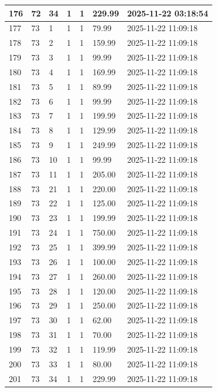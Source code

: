 \begin{longtable}{|l|l|l|l|l|l|l|}
176 & 72 & 34 & 1 & 1 & 229.99 & 2025-11-22 03:18:54 \\ \hline 
177 & 73 & 1 & 1 & 1 & 79.99 & 2025-11-22 11:09:18 \\ \hline 
178 & 73 & 2 & 1 & 1 & 159.99 & 2025-11-22 11:09:18 \\ \hline 
179 & 73 & 3 & 1 & 1 & 99.99 & 2025-11-22 11:09:18 \\ \hline 
180 & 73 & 4 & 1 & 1 & 169.99 & 2025-11-22 11:09:18 \\ \hline 
181 & 73 & 5 & 1 & 1 & 89.99 & 2025-11-22 11:09:18 \\ \hline 
182 & 73 & 6 & 1 & 1 & 99.99 & 2025-11-22 11:09:18 \\ \hline 
183 & 73 & 7 & 1 & 1 & 199.99 & 2025-11-22 11:09:18 \\ \hline 
184 & 73 & 8 & 1 & 1 & 129.99 & 2025-11-22 11:09:18 \\ \hline 
185 & 73 & 9 & 1 & 1 & 249.99 & 2025-11-22 11:09:18 \\ \hline 
186 & 73 & 10 & 1 & 1 & 99.99 & 2025-11-22 11:09:18 \\ \hline 
187 & 73 & 11 & 1 & 1 & 205.00 & 2025-11-22 11:09:18 \\ \hline 
188 & 73 & 21 & 1 & 1 & 220.00 & 2025-11-22 11:09:18 \\ \hline 
189 & 73 & 22 & 1 & 1 & 125.00 & 2025-11-22 11:09:18 \\ \hline 
190 & 73 & 23 & 1 & 1 & 199.99 & 2025-11-22 11:09:18 \\ \hline 
191 & 73 & 24 & 1 & 1 & 750.00 & 2025-11-22 11:09:18 \\ \hline 
192 & 73 & 25 & 1 & 1 & 399.99 & 2025-11-22 11:09:18 \\ \hline 
193 & 73 & 26 & 1 & 1 & 100.00 & 2025-11-22 11:09:18 \\ \hline 
194 & 73 & 27 & 1 & 1 & 260.00 & 2025-11-22 11:09:18 \\ \hline 
195 & 73 & 28 & 1 & 1 & 120.00 & 2025-11-22 11:09:18 \\ \hline 
196 & 73 & 29 & 1 & 1 & 250.00 & 2025-11-22 11:09:18 \\ \hline 
197 & 73 & 30 & 1 & 1 & 62.00 & 2025-11-22 11:09:18 \\ \hline 
198 & 73 & 31 & 1 & 1 & 70.00 & 2025-11-22 11:09:18 \\ \hline 
199 & 73 & 32 & 1 & 1 & 119.99 & 2025-11-22 11:09:18 \\ \hline 
200 & 73 & 33 & 1 & 1 & 80.00 & 2025-11-22 11:09:18 \\ \hline 
201 & 73 & 34 & 1 & 1 & 229.99 & 2025-11-22 11:09:18 \\ \hline 
 \end{longtable}

